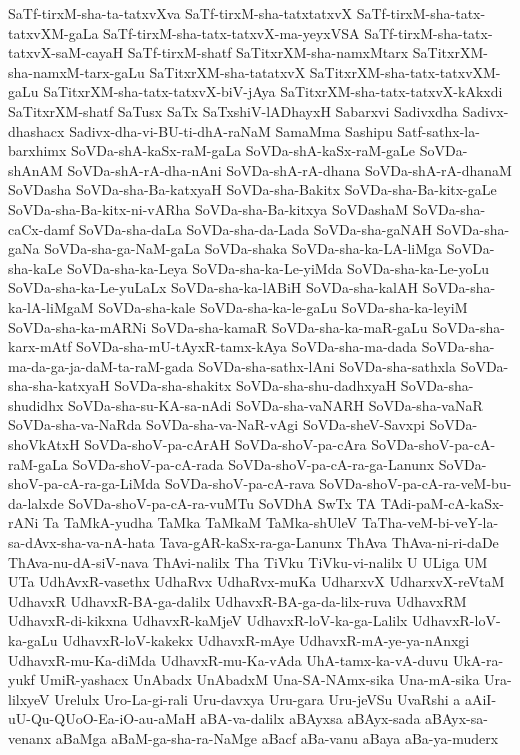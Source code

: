 {SaTf-tirxM-sha-ta-tatxvXva
SaTf-tirxM-sha-tatxtatxvX
SaTf-tirxM-sha-tatx-tatxvXM-gaLa
SaTf-tirxM-sha-tatx-tatxvX-ma-yeyxVSA
SaTf-tirxM-sha-tatx-tatxvX-saM-cayaH
SaTf-tirxM-shatf
SaTitxrXM-sha-namxMtarx
SaTitxrXM-sha-namxM-tarx-gaLu
SaTitxrXM-sha-tatatxvX
SaTitxrXM-sha-tatx-tatxvXM-gaLu
SaTitxrXM-sha-tatx-tatxvX-biV-jAya
SaTitxrXM-sha-tatx-tatxvX-kAkxdi
SaTitxrXM-shatf
SaTusx
SaTx
SaTxshiV-lADhayxH
Sabarxvi
Sadivxdha
Sadivx-dhashacx
Sadivx-dha-vi-BU-ti-dhA-raNaM
SamaMma
Sashipu
Satf-sathx-la-barxhimx
SoVDa-shA-kaSx-raM-gaLa
SoVDa-shA-kaSx-raM-gaLe
SoVDa-shAnAM
SoVDa-shA-rA-dha-nAni
SoVDa-shA-rA-dhana
SoVDa-shA-rA-dhanaM
SoVDasha
SoVDa-sha-Ba-katxyaH
SoVDa-sha-Bakitx
SoVDa-sha-Ba-kitx-gaLe
SoVDa-sha-Ba-kitx-ni-vARha
SoVDa-sha-Ba-kitxya
SoVDashaM
SoVDa-sha-caCx-damf
SoVDa-sha-daLa
SoVDa-sha-da-Lada
SoVDa-sha-gaNAH
SoVDa-sha-gaNa
SoVDa-sha-ga-NaM-gaLa
SoVDa-shaka
SoVDa-sha-ka-LA-liMga
SoVDa-sha-kaLe
SoVDa-sha-ka-Leya
SoVDa-sha-ka-Le-yiMda
SoVDa-sha-ka-Le-yoLu
SoVDa-sha-ka-Le-yuLaLx
SoVDa-sha-ka-lABiH
SoVDa-sha-kalAH
SoVDa-sha-ka-lA-liMgaM
SoVDa-sha-kale
SoVDa-sha-ka-le-gaLu
SoVDa-sha-ka-leyiM
SoVDa-sha-ka-mARNi
SoVDa-sha-kamaR
SoVDa-sha-ka-maR-gaLu
SoVDa-sha-karx-mAtf
SoVDa-sha-mU-tAyxR-tamx-kAya
SoVDa-sha-ma-dada
SoVDa-sha-ma-da-ga-ja-daM-ta-raM-gada
SoVDa-sha-sathx-lAni
SoVDa-sha-sathxla
SoVDa-sha-sha-katxyaH
SoVDa-sha-shakitx
SoVDa-sha-shu-dadhxyaH
SoVDa-sha-shudidhx
SoVDa-sha-su-KA-sa-nAdi
SoVDa-sha-vaNARH
SoVDa-sha-vaNaR
SoVDa-sha-va-NaRda
SoVDa-sha-va-NaR-vAgi
SoVDa-sheV-Savxpi
SoVDa-shoVkAtxH
SoVDa-shoV-pa-cArAH
SoVDa-shoV-pa-cAra
SoVDa-shoV-pa-cA-raM-gaLa
SoVDa-shoV-pa-cA-rada
SoVDa-shoV-pa-cA-ra-ga-Lanunx
SoVDa-shoV-pa-cA-ra-ga-LiMda
SoVDa-shoV-pa-cA-rava
SoVDa-shoV-pa-cA-ra-veM-bu-da-lalxde
SoVDa-shoV-pa-cA-ra-vuMTu
SoVDhA
SwTx
TA
TAdi-paM-cA-kaSx-rANi
Ta
TaMkA-yudha
TaMka
TaMkaM
TaMka-shUleV
TaTha-veM-bi-veY-la-sa-dAvx-sha-va-nA-hata
Tava-gAR-kaSx-ra-ga-Lanunx
ThAva
ThAva-ni-ri-daDe
ThAva-nu-dA-siV-nava
ThAvi-nalilx
Tha
TiVku
TiVku-vi-nalilx
U
ULiga
UM
UTa
UdhAvxR-vasethx
UdhaRvx
UdhaRvx-muKa
UdharxvX
UdharxvX-reVtaM
UdhavxR
UdhavxR-BA-ga-dalilx
UdhavxR-BA-ga-da-lilx-ruva
UdhavxRM
UdhavxR-di-kikxna
UdhavxR-kaMjeV
UdhavxR-loV-ka-ga-Lalilx
UdhavxR-loV-ka-gaLu
UdhavxR-loV-kakekx
UdhavxR-mAye
UdhavxR-mA-ye-ya-nAnxgi
UdhavxR-mu-Ka-diMda
UdhavxR-mu-Ka-vAda
UhA-tamx-ka-vA-duvu
UkA-ra-yukf
UmiR-yashacx
UnAbadx
UnAbadxM
Una-SA-NAmx-sika
Una-mA-sika
Ura-lilxyeV
Urelulx
Uro-La-gi-rali
Uru-davxya
Uru-gara
Uru-jeVSu
UvaRshi
a
aAiI-uU-Qu-QUoO-Ea-iO-au-aMaH
aBA-va-dalilx
aBAyxsa
aBAyx-sada
aBAyx-sa-venanx
aBaMga
aBaM-ga-sha-ra-NaMge
aBacf
aBa-vanu
aBaya
aBa-ya-muderx
}
